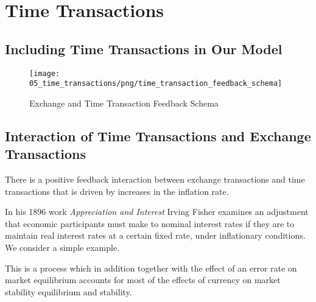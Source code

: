 \section{Time Transactions}
\label{section:time_transactions}

\subsection{Including Time Transactions in Our Model}

\begin{figure}[H]
\centering
\texttt{[image: 05\_time\_transactions/png/time\_transaction\_feedback\_schema]}
\caption{Exchange and Time Transaction Feedback Schema}
\label{fig:exchange_and_time_transaction_schema1}
\end{figure}

\subsection{Interaction of Time Transactions and Exchange Transactions}

There is a positive feedback interaction between exchange transactions and time transactions that is
driven by increases in the inflation rate.

In his 1896 work \textit{Appreciation and Interest} Irving Fisher examines an adjustment that
economic participants must make to nominal interest rates if they are to maintain real interest
rates at a certain fixed rate, under inflationary conditions. We consider a simple example.





This is a process which in addition together with the effect of an error rate on market equilibrium
accounts for most of the effects of currency on market stability equilibrium and stability.


